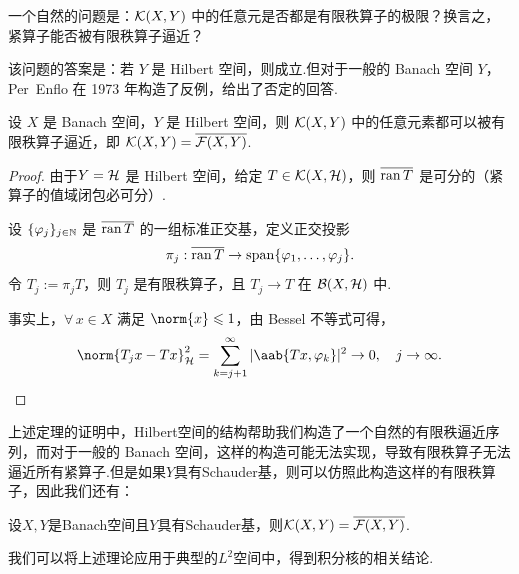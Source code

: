 一个自然的问题是：$\mathcal{K}(X,Y)$ 中的任意元是否都是有限秩算子的极限？换言之，紧算子能否被有限秩算子逼近？\par
该问题的答案是：若 $Y$ 是 Hilbert 空间，则成立.但对于一般的 Banach 空间 $Y$，Per~Enflo 在 1973 年构造了反例，给出了否定的回答.\par

\begin{theorem}[有限秩逼近]
设 $X$ 是 Banach 空间，$Y$ 是 Hilbert 空间，则 $\mathcal{K}(X,Y)$ 中的任意元素都可以被有限秩算子逼近，即 $\mathcal{K}(X,Y) = \overline{\mathcal{F}(X,Y)}$.
\end{theorem}
\begin{proof}
    由于$Y = \mathcal{H}$ 是 Hilbert 空间，给定 $T\in\mathcal{K}(X,\mathcal{H})$，则 $\overline{\operatorname{ran} T}$ 是可分的（紧算子的值域闭包必可分）.\par
设 $\{\varphi_j\}_{j\in\mathbb{N}}$ 是 $\overline{\operatorname{ran} T}$ 的一组标准正交基，定义正交投影
\begin{equation*}
\pi_j : \overline{\operatorname{ran} T} \to \operatorname{span}\{\varphi_1,\dots,\varphi_j\}.
\end{equation*}
令 $T_j := \pi_j T$，则 $T_j$ 是有限秩算子，且 $T_j\to T$ 在 $\mathcal{B}(X,\mathcal{H})$ 中.\par
事实上，$\forall\, x\in X$ 满足 $\norm{x}\leq 1$，由 Bessel 不等式可得，
\begin{equation*}
\norm{T_j x - Tx}_{\mcal{H}}^2 = \sum_{k=j+1}^{\infty} |\aab{Tx, \varphi_k}|^2 \to 0,\quad j\to\infty.\qedhere
\end{equation*}
\end{proof}
上述定理的证明中，Hilbert空间的结构帮助我们构造了一个自然的有限秩逼近序列，而对于一般的 Banach 空间，这样的构造可能无法实现，导致有限秩算子无法逼近所有紧算子.但是如果$Y$具有Schauder基，则可以仿照此构造这样的有限秩算子，因此我们还有：
\begin{corollary}[]
    设$X,Y$是Banach空间且$Y$具有Schauder基，则$\mathcal{K}(X,Y) = \overline{\mathcal{F}(X,Y)}$.
\end{corollary}

我们可以将上述理论应用于典型的$L^2$空间中，得到积分核的相关结论.\par

